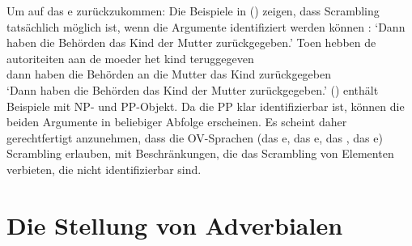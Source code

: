 Um auf das e zurückzukommen: Die Beispiele in () zeigen, dass Scrambling tatsächlich möglich ist, wenn die Argumente
identifiziert werden können \parencites[]{GHdRvdT1984a-ed}[, 152]{Haider2010a}:
\eal
\ex
{}
\glt `Dann haben die Behörden das Kind der Mutter zurückgegeben.'
\ex
\gll Toen hebben de  autoriteiten aan de moeder  het kind  teruggegeven\\
     dann haben   die Behörden  an  die Mutter  das Kind  zurückgegeben\\
\glt `Dann haben die Behörden das Kind der Mutter zurückgegeben.'
\zl
() enthält Beispiele mit NP- und PP-Objekt. Da die PP klar identifizierbar ist, können die beiden
Argumente in beliebiger Abfolge erscheinen. Es scheint daher gerechtfertigt anzunehmen, dass die OV-Sprachen (das e,
das e, das , das e) Scrambling erlauben, mit Beschränkungen, die das Scrambling von Elementen verbieten, die
nicht identifizierbar sind.%

\section{Die Stellung von Adverbialen}
\label{sec-phenomena-position-of-adverbials}

